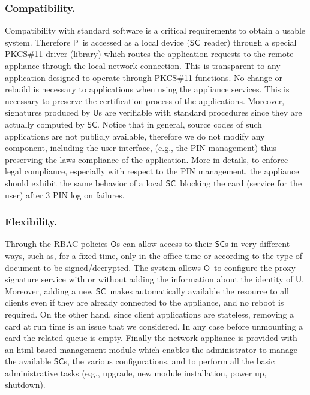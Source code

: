 \documentclass[preprint,authoryear,12pt]{elsarticle}
\newcommand{\Owner}{\ensuremath{\mathsf{O}}}
\newcommand{\User}{\ensuremath{\mathsf{U}}}
\newcommand{\Proxy}{\ensuremath{\mathsf{P}}}
\newcommand{\SC}{\ensuremath{\mathsf{SC}}}
\begin{document}
\subsubsection{Compatibility.} Compatibility with standard software is a critical requirements to obtain a usable system. Therefore \Proxy\ is
accessed as a local device (\SC\ reader) through a special PKCS\#11 driver (library) which routes the application requests to the remote appliance through the local network connection. This is transparent to any application designed to operate through PKCS\#11 functions. No change or rebuild is necessary to applications when using the appliance services. This is necessary to preserve the certification process of the applications. Moreover, signatures produced by \User s are verifiable with standard procedures since they are actually computed by \SC. Notice that in general, source codes of such applications are not publicly available, therefore
we do not modify any component, including the user interface, (e.g., the PIN management) thus preserving the laws compliance of the application. More in details, to enforce legal compliance, especially with respect to the PIN management, the appliance should exhibit the same behavior of a local \SC\ blocking the card (service for the user) after $3$ PIN log on failures.

\subsubsection{Flexibility.}
Through the RBAC policies \Owner s can allow access to their \SC s in very different ways, such as, for a fixed time, only in the office time or according to the type of document to be signed/decrypted. The system allows \Owner\ to configure the proxy signature service with or without adding
the information about the identity of  \User . Moreover,  adding a new \SC\  makes automatically available the resource to all clients even if they are already connected to the appliance, and no reboot is required. On the other hand, since client applications are stateless, removing a card at run time is an issue that we considered. In any case before unmounting a card the related queue is empty. Finally the network appliance is provided with an html-based management module which enables the administrator to manage the available \SC s, the various configurations, and to perform all the basic administrative tasks (e.g., upgrade, new module installation, power up, shutdown).
\end{document}
